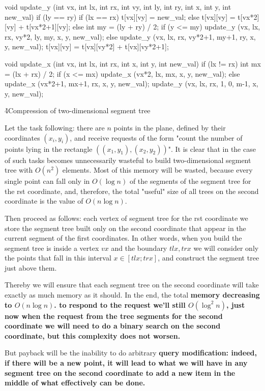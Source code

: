 \code
void update_y (int vx, int lx, int rx, int vy, int ly, int ry, int x, int y, int new_val) {
if (ly == ry) {
if (lx == rx)
t[vx][vy] = new_val;
else
t[vx][vy] = t[vx*2][vy] + t[vx*2+1][vy];
}
else {
int my = (ly + ry) / 2;
if (y <= my)
update_y (vx, lx, rx, vy*2, ly, my, x, y, new_val);
else
update_y (vx, lx, rx, vy*2+1, my+1, ry, x, y, new_val);
t[vx][vy] = t[vx][vy*2] + t[vx][vy*2+1];
}
}

void update_x (int vx, int lx, int rx, int x, int y, int new_val) {
if (lx != rx) {
int mx = (lx + rx) / 2;
if (x <= mx)
update_x (vx*2, lx, mx, x, y, new_val);
else
update_x (vx*2+1, mx+1, rx, x, y, new_val);
}
update_y (vx, lx, rx, 1, 0, m-1, x, y, new_val);
}
\endcode

\h4{Compression of two-dimensional segment tree}

Let the task following: there are $n$ points in the plane, defined by their coordinates $(x_i,y_i)$, and receive requests of the form "count the number of points lying in the rectangle $((x_1,y_1),(x_2,y_2))$". It is clear that in the case of such tasks becomes unnecessarily wasteful to build two-dimensional segment tree with $O (n^2)$ elements. Most of this memory will be wasted, because every single point can fall only in $O (\log n)$ of the segments of the segment tree for the rst coordinate, and, therefore, the total "useful" size of all trees on the second coordinate is the value of $O (n \log n)$.

Then proceed as follows: each vertex of segment tree for the rst coordinate we store the segment tree built only on the second coordinate that appear in the current segment of the first coordinates. In other words, when you build the segment tree is inside a vertex $vx$ and the boundary $tlx, trx$ we will consider only the points that fall in this interval $x \in [tlx; trx]$, and construct the segment tree just above them.

Thereby we will ensure that each segment tree on the second coordinate will take exactly as much memory as it should. In the end, the total \bf{memory} decreasing to $O (n \log n)$. \bf{to respond to the request} we'll still $O (\log^2 n)$, just now when the request from the tree segments for the second coordinate we will need to do a binary search on the second coordinate, but this complexity does not worsen.

But payback will be the inability to do arbitrary \bf{query modification}: indeed, if there will be a new point, it will lead to what we will have in any segment tree on the second coordinate to add a new item in the middle of what effectively can be done.

